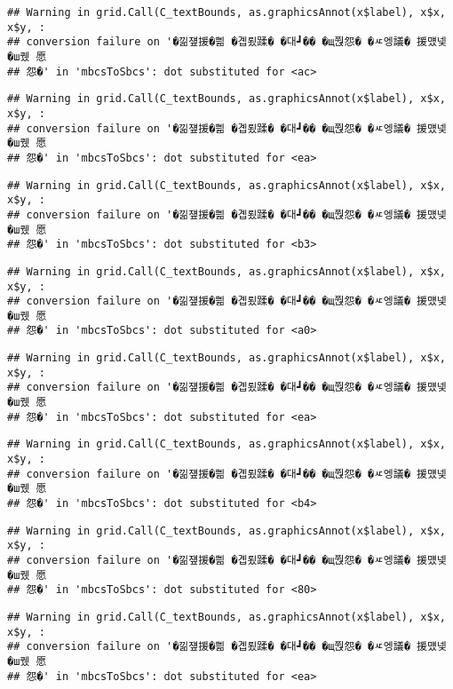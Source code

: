 \documentclass[
]{article}
\begin{document}
\begin{verbatim}
## Warning in grid.Call(C_textBounds, as.graphicsAnnot(x$label), x$x, x$y, :
## conversion failure on '�낆쟾援�쁾 �곕룄蹂� �대┛�� �щ쭩怨� �ㅼ엥議� 援먰넻�ш퀬 愿
## 怨�' in 'mbcsToSbcs': dot substituted for <ac>
\end{verbatim}

\begin{verbatim}
## Warning in grid.Call(C_textBounds, as.graphicsAnnot(x$label), x$x, x$y, :
## conversion failure on '�낆쟾援�쁾 �곕룄蹂� �대┛�� �щ쭩怨� �ㅼ엥議� 援먰넻�ш퀬 愿
## 怨�' in 'mbcsToSbcs': dot substituted for <ea>
\end{verbatim}

\begin{verbatim}
## Warning in grid.Call(C_textBounds, as.graphicsAnnot(x$label), x$x, x$y, :
## conversion failure on '�낆쟾援�쁾 �곕룄蹂� �대┛�� �щ쭩怨� �ㅼ엥議� 援먰넻�ш퀬 愿
## 怨�' in 'mbcsToSbcs': dot substituted for <b3>
\end{verbatim}

\begin{verbatim}
## Warning in grid.Call(C_textBounds, as.graphicsAnnot(x$label), x$x, x$y, :
## conversion failure on '�낆쟾援�쁾 �곕룄蹂� �대┛�� �щ쭩怨� �ㅼ엥議� 援먰넻�ш퀬 愿
## 怨�' in 'mbcsToSbcs': dot substituted for <a0>
\end{verbatim}

\begin{verbatim}
## Warning in grid.Call(C_textBounds, as.graphicsAnnot(x$label), x$x, x$y, :
## conversion failure on '�낆쟾援�쁾 �곕룄蹂� �대┛�� �щ쭩怨� �ㅼ엥議� 援먰넻�ш퀬 愿
## 怨�' in 'mbcsToSbcs': dot substituted for <ea>
\end{verbatim}

\begin{verbatim}
## Warning in grid.Call(C_textBounds, as.graphicsAnnot(x$label), x$x, x$y, :
## conversion failure on '�낆쟾援�쁾 �곕룄蹂� �대┛�� �щ쭩怨� �ㅼ엥議� 援먰넻�ш퀬 愿
## 怨�' in 'mbcsToSbcs': dot substituted for <b4>
\end{verbatim}

\begin{verbatim}
## Warning in grid.Call(C_textBounds, as.graphicsAnnot(x$label), x$x, x$y, :
## conversion failure on '�낆쟾援�쁾 �곕룄蹂� �대┛�� �щ쭩怨� �ㅼ엥議� 援먰넻�ш퀬 愿
## 怨�' in 'mbcsToSbcs': dot substituted for <80>
\end{verbatim}

\begin{verbatim}
## Warning in grid.Call(C_textBounds, as.graphicsAnnot(x$label), x$x, x$y, :
## conversion failure on '�낆쟾援�쁾 �곕룄蹂� �대┛�� �щ쭩怨� �ㅼ엥議� 援먰넻�ш퀬 愿
## 怨�' in 'mbcsToSbcs': dot substituted for <ea>
\end{verbatim}
\end{document}
